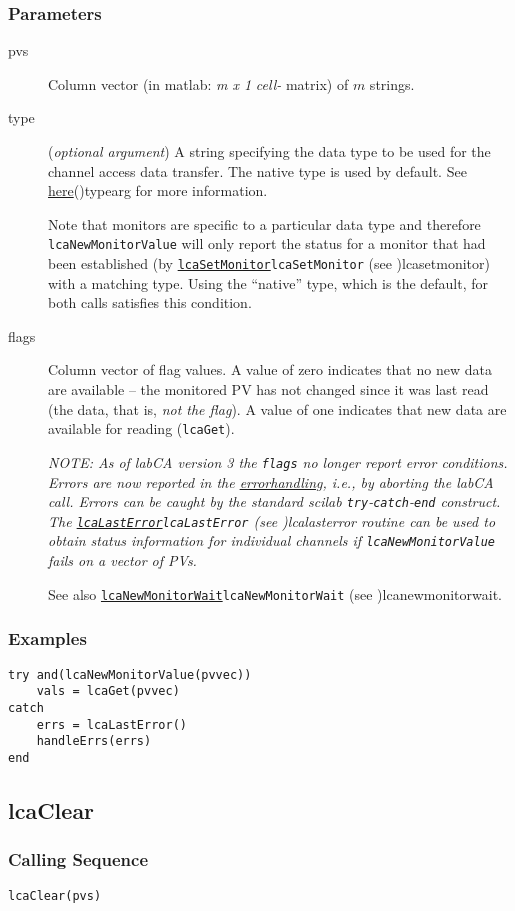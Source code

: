 \documentclass{article}
\newcommand{\sca}{\ita{labCA}}
\newcommand{\scilab}{\ita{scilab}}
\newcommand{\com}[1]{{\tt #1}}
\newcommand{\pbrk}{\pagebreak[3]}
\newcommand{\comref}[2]{\hyperref[ref]{\com{#1}}{\com{#1} (see }{)}{#2}}
\newcommand{\ita}[1]{\emph{#1}}
\newcommand{\m}{$m$}
\newcommand{\mhack}{$m$} %
\newcommand{\mxl}{$m\times 1$}
\renewcommand{\m}{\ita{m}}
\newcommand{\mhack}{\ita{m}} %
\renewcommand{\mxl}{\ita{m x 1}}
\renewcommand{\pbrk}{}
\newcommand{\PVITEM}{
\item[pvs] Column vector (in matlab: \mxl{} \ita{cell-} matrix)
of \mhack{} strings.
}
\begin{document}
\subsubsection{Parameters}
\begin{description}
\PVITEM
\item[type]
(\ita{optional argument}) A string specifying the
data type to be used for the channel access data transfer. The
native type is used by default.
See \hyperref[ref]{here}{(}{)}{typearg} for more information.

Note that monitors are specific to a particular data type and therefore
\com{lcaNewMonitorValue} will only report the status for a monitor that had been established
(by \comref{lcaSetMonitor}{lcasetmonitor}) with a matching type.
Using the ``native'' type, which is the default, for both calls
satisfies this condition.
\item[flags]
Column vector of flag values. A value of zero indicates that no new data are available --
the monitored PV has not changed since it was last read (the data, that is, {\em not the flag}).
A value of one indicates that new data are available for reading (\com{lcaGet}).

{\em NOTE: As of \sca{} version 3 the \com{flags} no longer report error conditions.
Errors are now reported in the 
\hyperref{standard way}{standard way (see~}{)}{errorhandling},
i.e., by aborting the \sca{} call.
Errors can be caught by the standard \scilab{} \com{try}-\com{catch}-\com{end}
construct. The \comref{lcaLastError}{lcalasterror} routine can be used to obtain
status information for individual channels if \com{lcaNewMonitorValue} fails on
a vector of PVs.}

See also \comref{lcaNewMonitorWait}{lcanewmonitorwait}.
\end{description}
\subsubsection{Examples}
\begin{verbatim}
try and(lcaNewMonitorValue(pvvec))
	vals = lcaGet(pvvec)
catch
    errs = lcaLastError()
	handleErrs(errs)
end
\end{verbatim}

\pbrk
\subsection{lcaClear}
\label{lcaclear}
\subsubsection{Calling Sequence}
\begin{verbatim}
lcaClear(pvs)
\end{verbatim}
\end{document}
